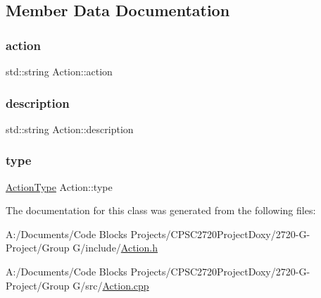 \subsection{Member Data Documentation}
\mbox{\label{class_action_a9d08b02c278c2d1835b25f922143328d}} 
\subsubsection{\texorpdfstring{action}{action}}
{\footnotesize\ttfamily std\+::string Action\+::action\hspace{0.3cm}{\ttfamily [protected]}}

\mbox{\label{class_action_a279273192c7d6d5f13796919bc2a79e3}} 
\subsubsection{\texorpdfstring{description}{description}}
{\footnotesize\ttfamily std\+::string Action\+::description\hspace{0.3cm}{\ttfamily [protected]}}

\mbox{\label{class_action_a9171771045247ad4471b371ced19e959}} 
\subsubsection{\texorpdfstring{type}{type}}
{\footnotesize\ttfamily \mbox{\hyperlink{_action_8h_a21d5e8f8cdaa838586b31007df0a950b}{Action\+Type}} Action\+::type\hspace{0.3cm}{\ttfamily [protected]}}



The documentation for this class was generated from the following files\+:\begin{DoxyCompactItemize}
\item 
A\+:/\+Documents/\+Code Blocks Projects/\+C\+P\+S\+C2720\+Project\+Doxy/2720-\/\+G-\/\+Project/\+Group G/include/\mbox{\hyperlink{_action_8h}{Action.\+h}}\item 
A\+:/\+Documents/\+Code Blocks Projects/\+C\+P\+S\+C2720\+Project\+Doxy/2720-\/\+G-\/\+Project/\+Group G/src/\mbox{\hyperlink{_action_8cpp}{Action.\+cpp}}\end{DoxyCompactItemize}
